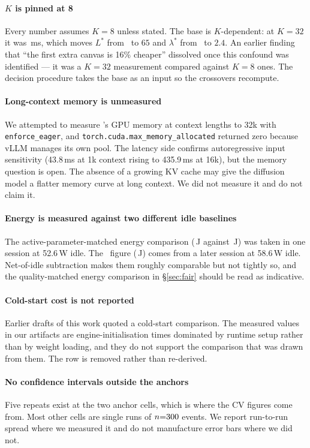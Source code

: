 \paragraph{$K$ is pinned at 8}
Every number assumes $K{=}8$ unless stated. The base is $K$-dependent: at
$K{=}32$ it was \dgOldBase\,ms, which moves $L^{*}$ from \crossoverL\ to $65$
and $\lambda^{*}$ from \crossoverLambda\ to $2.4$. An earlier finding that
``the first extra canvas is 16\% cheaper'' dissolved once this confound was
identified --- it was a $K{=}32$ measurement compared against $K{=}8$ ones.
The decision procedure takes the base as an input so the crossovers recompute.

\paragraph{Long-context memory is unmeasured}
We attempted to measure \ARoneb's GPU memory at context lengths to 32k with
\texttt{enforce\_eager}, and \texttt{torch.cuda.max\_memory\_allocated}
returned zero because vLLM manages its own pool. The latency side confirms
autoregressive input sensitivity (43.8\,ms at 1k context rising to 435.9\,ms
at 16k), but the memory question is open. The absence of a growing KV cache
may give the diffusion model a flatter memory curve at long context. We did
not measure it and do not claim it.

\paragraph{Energy is measured against two different idle baselines}
The active-parameter-matched energy comparison (\arThreeEnergy\,J against
\dgEnergy\,J) was taken in one session at 52.6\,W idle. The \ARoneb\ figure
(\arOneFiveEnergy\,J) comes from a later session at 58.6\,W idle. Net-of-idle
subtraction makes them roughly comparable but not tightly so, and the
quality-matched energy comparison in \S\ref{sec:fair} should be read as
indicative.

\paragraph{Cold-start cost is not reported}
Earlier drafts of this work quoted a cold-start comparison. The measured
values in our artifacts are engine-initialisation times dominated by runtime
setup rather than by weight loading, and they do not support the comparison
that was drawn from them. The row is removed rather than re-derived.

\paragraph{No confidence intervals outside the anchors}
Five repeats exist at the two anchor cells, which is where the CV figures come
from. Most other cells are single runs of $n{=}300$ events. We report
run-to-run spread where we measured it and do not manufacture error bars where
we did not.
